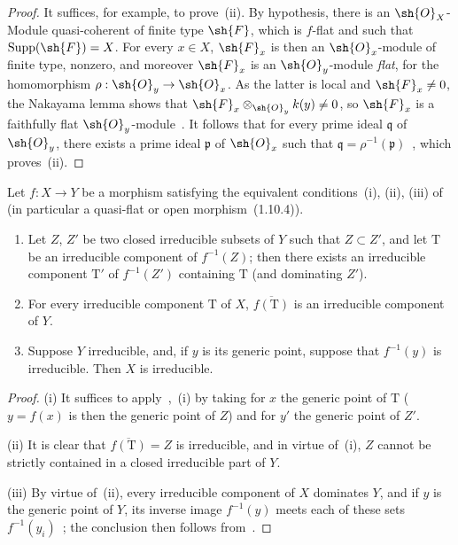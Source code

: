 \begin{proof}
It suffices, for example, to prove~(ii).
By hypothesis, there is an $\sh{O}_X$-Module quasi-coherent of finite type $\sh{F}$, which is $f$-flat and such that $\operatorname{Supp}(\sh{F})=X$.
For every $x\in X$, $\sh{F}_x$ is then an $\sh{O}_x$-module of finite type, nonzero, and moreover $\sh{F}_x$ is an $\sh{O}_y$-module \emph{flat}, for the homomorphism $\rho:\sh{O}_y\to\sh{O}_x$.
As the latter is local and $\sh{F}_x\neq 0$, the Nakayama lemma shows that $\sh{F}_x\otimes_{\sh{O}_y}k(y)\neq 0$, so $\sh{F}_x$ is a faithfully flat $\sh{O}_y$-module~.
It follows that for every prime ideal $\mathfrak{q}$ of $\sh{O}_y$, there exists a prime ideal $\mathfrak{p}$ of $\sh{O}_x$ such that $\mathfrak{q}=\rho^{-1}(\mathfrak{p})$~, which proves~(ii).
\end{proof}

\begin{corollary}[2.3.5]
\label{IV.2.3.5}
Let $f:X\to Y$ be a morphism satisfying the equivalent conditions~(i), (ii), (iii) of~ \textnormal{(}in particular a quasi-flat or open morphism~(1.10.4)\textnormal{)}.
\begin{enumerate}[label=(\roman*)]
  \item Let $Z$, $Z'$ be two closed irreducible subsets of $Y$ such that $Z\subset Z'$, and let $\mathrm{T}$ be an irreducible component of $f^{-1}(Z)$; then there exists an irreducible component $\mathrm{T}'$ of $f^{-1}(Z')$ containing $\mathrm{T}$ \textnormal{(}and dominating $Z'$\textnormal{)}.
  \item For every irreducible component $\mathrm{T}$ of $X$, $\overline{f(\mathrm{T})}$ is an irreducible component of $Y$.
  \item Suppose $Y$ irreducible, and, if $y$ is its generic point, suppose that $f^{-1}(y)$ is irreducible. Then $X$ is irreducible.
\end{enumerate}
\end{corollary}

\begin{proof}
(i) It suffices to apply~,~(i) by taking for $x$ the generic point of $\mathrm{T}$ ($y=f(x)$ is then the generic point of $Z$) and for $y'$ the generic point of $Z'$.

(ii) It is clear that $\overline{f(\mathrm{T})}=Z$ is irreducible, and in virtue of~(i), $Z$ cannot be strictly contained in a closed irreducible part of $Y$.

(iii) By virtue of~(ii), every irreducible component of $X$ dominates $Y$, and if $y$ is the generic point of $Y$, its inverse image $f^{-1}(y)$ meets each of these sets $f^{-1}(y_i)$~; the conclusion then follows from~.
\end{proof}


